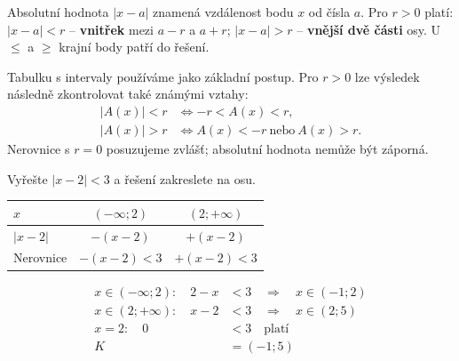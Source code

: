 \documentclass[11pt,a4paper]{article}
\begin{document}
Absolutní hodnota $|x-a|$ znamená vzdálenost bodu $x$ od čísla $a$. Pro $r>0$ platí: $|x-a|<r$ -- \textbf{vnitřek} mezi $a-r$ a $a+r$; $|x-a|>r$ -- \textbf{vnější dvě části} osy. U $\le$ a $\ge$ krajní body patří do řešení.
\begin{center}
\end{center}
Tabulku s intervaly používáme jako základní postup. Pro $r>0$ lze výsledek následně zkontrolovat také známými vztahy:
\[
\begin{aligned}
|A(x)|<r&\iff-r<A(x)<r,\\
|A(x)|>r&\iff A(x)<-r\ \text{nebo}\ A(x)>r.
\end{aligned}
\]
Nerovnice s $r=0$ posuzujeme zvlášť; absolutní hodnota nemůže být záporná.
\begin{prikladReseniBox}[title={Příklad 1}]
Vyřešte $|x-2|<3$ a řešení zakreslete na osu.
\tcblower
\begin{center}
\begingroup\footnotesize
\renewcommand{\arraystretch}{1.32}
\begin{tabular}{@{}lcc@{}}
\toprule
$x$ & $(-\infty;2)$ & $(2;+\infty)$ \\
\midrule
$|x - 2|$ & $-(x - 2)$ & $+(x - 2)$ \\
\midrule
Nerovnice & $-(x - 2)<3$ & $+(x - 2)<3$ \\
\bottomrule
\end{tabular}
\endgroup
\end{center}
\[\begin{aligned}x\in (-\infty;2):\quad 2 - x &< 3\quad\Longrightarrow\quad x\in(-1;2)\\[2pt]
x\in (2;+\infty):\quad x - 2 &< 3\quad\Longrightarrow\quad x\in(2;5)\\[2pt]
x=2:\quad 0 &< 3\quad\text{platí}\\[2pt]
K&=(-1;5)\end{aligned}\]
\end{prikladReseniBox}
\end{document}

